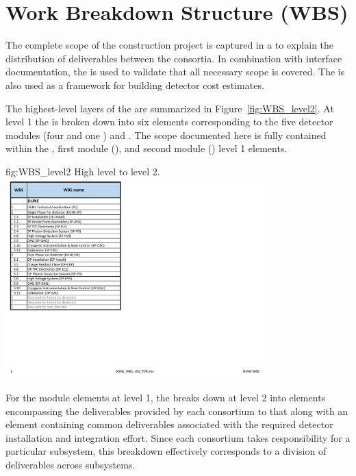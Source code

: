 \section{Work Breakdown Structure (WBS)}
\label{sec:fdsp-coord-wbs}

The complete scope of the  construction project is captured in a 
 to explain the distribution of deliverables between 
the consortia.  In combination with interface documentation, the 
 is used to validate that all necessary scope is covered.  The 
 is also used as a framework for building  
detector cost estimates.

The highest-level layers of the   are summarized 
in Figure~\ref{fig:WBS_level2}.  At level 1 the  is broken down into 
six elements corresponding to the five  detector modules (four 
 and one ) and .  The scope documented
here is fully contained within the , first  module 
(), and second  module () level 1 elements.   
\begin{dunefigure}{fig:WBS_level2}
  {High level   to level 2.}
  \includegraphics[width=0.75\textwidth]{graphics/WBS_level2_v2}
\end{dunefigure}

For the  module elements at level 1, the  breaks 
down at level 2 into elements encompassing the deliverables provided by 
each consortium to that  along with an element containing 
common deliverables associated with the required detector installation 
and integration effort.  Since each consortium takes responsibility 
for a particular subsystem, this breakdown effectively corresponds to 
a division of deliverables across subsystems. 

